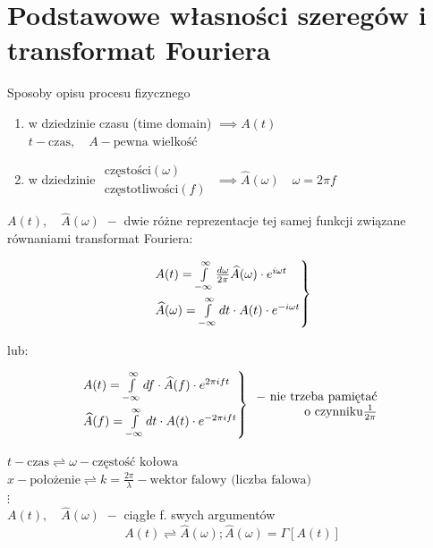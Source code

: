\section{Podstawowe własności szeregów i transformat Fouriera}
\begin{frame}[allowframebreaks]{Sposoby opisu procesu fizycznego}
	\begin{enumerate}
		\item w dziedzinie czasu (time domain) $ \implies A(t) $ \\
		$ t - \text{czas}, \quad A - \text{pewna wielkość} $
		\item w dziedzinie $
		\begin{array}{l}
		\text{częstości} (\omega) \\ \text{częstotliwości} (f)
		\end{array}$
		$\implies \widehat{A}(\omega) \quad \omega = 2 \pi f$
	\end{enumerate}
	$A(t), \quad \widehat{A}(\omega) \,\, - $ dwie różne reprezentacje tej samej funkcji związane równaniami transformat Fouriera:
	\begin{block}
	\centering
	\renewcommand{\arraystretch}{1.5}
	\setlength{\abovedisplayskip}{0pt}
	\setlength{\belowdisplayskip}{0pt}
	\setlength{\abovedisplayshortskip}{0pt}
	\setlength{\belowdisplayshortskip}{0pt}
	\[
	\begin{rcases*}
		A(t) = \int\limits_{-\infty}^{\infty}\frac{d \omega}{2\pi}\widehat{A}(\omega) \cdot e^{i \omega t} \\
		\widehat{A}(\omega) = \int\limits_{-\infty}^{\infty}dt \cdot A(t) \cdot e^{-i \omega t}
	\end{rcases*}
	\]
	\end{block}
	lub:
	\begin{block}
	\centering
	\renewcommand{\arraystretch}{1.5}
	\setlength{\abovedisplayskip}{0pt}
	\setlength{\belowdisplayskip}{0pt}
	\setlength{\abovedisplayshortskip}{0pt}
	\setlength{\belowdisplayshortskip}{0pt}
	\[
	\begin{rcases*}
		A(t) = \int\limits_{-\infty}^{\infty}df \cdot \widehat{A}(f) \cdot e^{2 \pi ift} \\
		\widehat{A}(f) = \int\limits_{-\infty}^{\infty}dt \cdot A(t) \cdot e^{-2 \pi ift}
	\end{rcases*}
	\begin{array}{r}
		- \,\, \text{nie trzeba pamiętać}\\ \text{o czynniku} \frac{1}{2 \pi}
	\end{array}
	\]
	\end{block}
	$t - \text{czas} \rightleftharpoons \omega - \text{częstość kołowa}$
	\\ $x - \text{położenie} \rightleftharpoons k = \frac{2 \pi}{\lambda} - \text{wektor falowy (liczba falowa)}$
	\\ $\vdots$
	\\ $A(t), \quad \widehat{A}(\omega) \,\, - $ ciągłe f. swych argumentów
	\[
		A(t) \rightleftharpoons \widehat{A}(\omega); \widehat{A}(\omega) = \Gamma[A(t)]
	\]
\end{frame}
